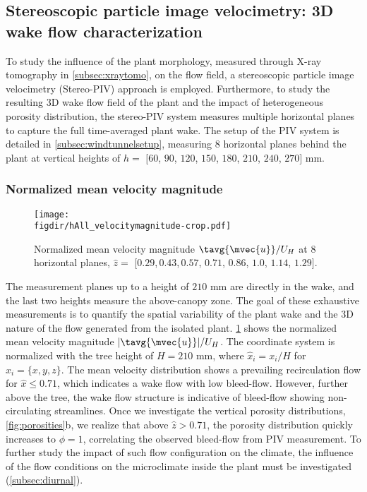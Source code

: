 \subsection{Stereoscopic particle image velocimetry: 3D wake flow characterization }
\label{subsec:stereopiv}

To study the influence of the plant morphology, measured through X-ray tomography in \cref{subsec:xraytomo}, on the flow field, a stereoscopic particle image velocimetry (Stereo-PIV) approach is employed. Furthermore, to study the resulting 3D wake flow field of the plant and the impact of heterogeneous porosity distribution, the stereo-PIV system measures multiple horizontal planes to capture the full time-averaged plant wake. The setup of the PIV system is detailed in \cref{subsec:windtunnelsetup}, measuring 8 horizontal planes behind the plant at vertical heights of $h =$ $[60$, $90$, $120$, $150$, $180$, $210$, $240$, $270]$ mm.

\subsubsection*{Normalized mean velocity magnitude}
	
\begin{sidewaysfigure}[p]
	\centering
	\texttt{[image: \\figdir/hAll\_velocitymagnitude-crop.pdf]}
	\caption{Normalized mean velocity magnitude $\tavg{\mvec{u}}/U_H$ at 8 horizontal planes, $\hat{z}=$ [$0.29$,\,$0.43$,\,$0.57$, $0.71$, $0.86$, $1.0$, $1.14$, $1.29]$.}
	\label{fig:meanflow}
\end{sidewaysfigure}

The measurement planes up to a height of $210$ mm are directly in the wake, and the last two heights measure the above-canopy zone. The goal of these exhaustive measurements is to quantify the spatial variability of the plant wake and the 3D nature of the flow generated from the isolated plant. \cref{fig:meanflow} shows the normalized mean velocity magnitude $|\tavg{\mvec{u}}|/U_H$. The coordinate system is normalized with the tree height of $H=210$ mm, where $\hat{x}_i = x_i / H$ for $x_i =\{x,y,z\}$. The mean velocity distribution shows a prevailing recirculation flow for $\hat{x} \le 0.71$, which indicates a wake flow with low bleed-flow. However, further above the tree, the wake flow structure is indicative of bleed-flow showing non-circulating streamlines. Once we investigate the vertical porosity distributions, \cref{fig:porosities}b, we realize that above $\hat{z}>0.71$, the porosity distribution quickly increases to $\phi=1$, correlating the observed bleed-flow from PIV measurement. To further study the impact of such flow configuration on the climate, the influence of the flow conditions on the microclimate inside the plant must be investigated (\cref{subsec:diurnal}). 


